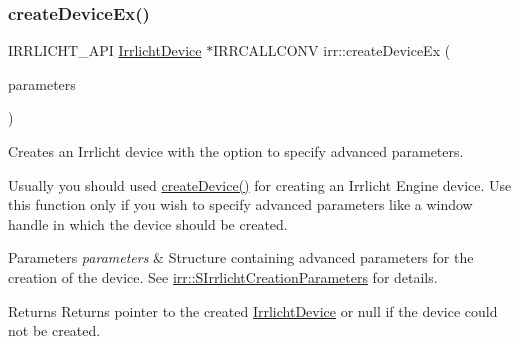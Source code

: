 \subsubsection{\texorpdfstring{create\+Device\+Ex()}{createDeviceEx()}}
{\footnotesize\ttfamily I\+R\+R\+L\+I\+C\+H\+T\+\_\+\+A\+PI \hyperlink{classirr_1_1IrrlichtDevice}{Irrlicht\+Device} $\ast$I\+R\+R\+C\+A\+L\+L\+C\+O\+NV irr\+::create\+Device\+Ex (\begin{DoxyParamCaption}\item[{const \hyperlink{structirr_1_1SIrrlichtCreationParameters}{S\+Irrlicht\+Creation\+Parameters} \&}]{parameters }\end{DoxyParamCaption})}



Creates an Irrlicht device with the option to specify advanced parameters. 

Usually you should used \hyperlink{namespaceirr_a57653fdaf6b2746b141ba2bb07d8bba6}{create\+Device()} for creating an Irrlicht Engine device. Use this function only if you wish to specify advanced parameters like a window handle in which the device should be created. 
\begin{DoxyParams}{Parameters}
{\em parameters} & Structure containing advanced parameters for the creation of the device. See \hyperlink{structirr_1_1SIrrlichtCreationParameters}{irr\+::\+S\+Irrlicht\+Creation\+Parameters} for details. \\
\hline
\end{DoxyParams}
\begin{DoxyReturn}{Returns}
Returns pointer to the created \hyperlink{classirr_1_1IrrlichtDevice}{Irrlicht\+Device} or null if the device could not be created. 
\end{DoxyReturn}
